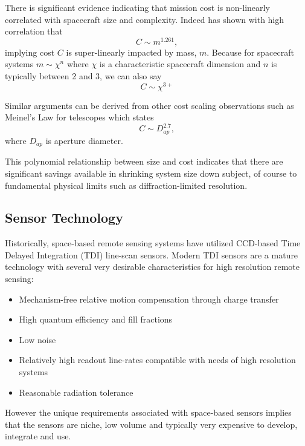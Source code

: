 \documentclass[10pt,journal]{IEEEtran}  %
\begin{document}
There is significant evidence indicating that mission cost is non-linearly correlated with spacecraft size and complexity.  Indeed \cite{bearden} has shown with high correlation that 
\begin{equation*}
    C \sim m^{1.261},
\end{equation*}
implying cost $C$ is super-linearly impacted by mass, $m$.  Because for spacecraft systems $m \sim \chi^n$ where $\chi$ is a characteristic spacecraft dimension and $n$ is typically between 2 and 3, we can also say
\begin{equation}
C \sim \chi^{3+}
\end{equation}

Similar arguments can be derived from other cost scaling observations such as Meinel's Law \cite{meinel} for telescopes which states
\begin{equation}
    C \sim D_{ap}^{2.7},
\end{equation}
where $D_{ap}$ is aperture diameter.

This polynomial relationship between size and cost indicates that there are significant savings available in shrinking system size down subject, of course to fundamental physical limits such as diffraction-limited resolution.  

\subsection{Sensor Technology}
\label{sec:sensor_trends}

Historically, space-based remote sensing systems have utilized CCD-based Time Delayed Integration (TDI) line-scan sensors.  Modern TDI sensors are a mature technology with several very desirable characteristics for high resolution remote sensing:

\begin{itemize}
    \item Mechanism-free relative motion compensation through charge transfer
    \item High quantum efficiency and fill fractions
    \item Low noise
    \item Relatively high readout line-rates compatible with needs of high resolution systems
    \item Reasonable radiation tolerance
\end{itemize}

However the unique requirements associated with space-based sensors implies that the sensors are niche, low volume and typically very expensive to develop, integrate and use.
\end{document}
